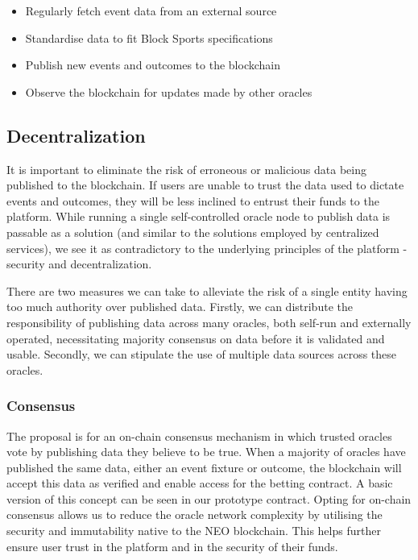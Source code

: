 \documentclass{article}
\begin{document}
\begin{itemize}
	\item Regularly fetch event data from an external source
	\item Standardise data to fit Block Sports specifications
	\item Publish new events and outcomes to the blockchain
	\item Observe the blockchain for updates made by other oracles
\end{itemize}

	\subsection{Decentralization}
	It is important to eliminate the risk of erroneous or malicious data being published to the blockchain. If users are unable to trust the data used to dictate events and outcomes, they will be less inclined to entrust their funds to the platform. While running a single self-controlled oracle node to publish data is passable as a solution (and similar to the solutions employed by centralized services), we see it as contradictory to the underlying principles of the platform - security and decentralization.

There are two measures we can take to alleviate the risk of a single entity having too much authority over published data. Firstly, we can distribute the responsibility of publishing data across many oracles, both self-run and externally operated, necessitating majority consensus on data before it is validated and usable. Secondly, we can stipulate the use of multiple data sources across these oracles.

		\subsubsection{Consensus}
The proposal is for an on-chain consensus mechanism in which trusted oracles vote by publishing data they believe to be true. When a majority of oracles have published the same data, either an event fixture or outcome, the blockchain will accept this data as verified and enable access for the betting contract. A basic version of this concept can be seen in our prototype contract. Opting for on-chain consensus allows us to reduce the oracle network complexity by utilising the security and immutability native to the NEO blockchain. This helps further ensure user trust in the platform and in the security of their funds.
\end{document}
